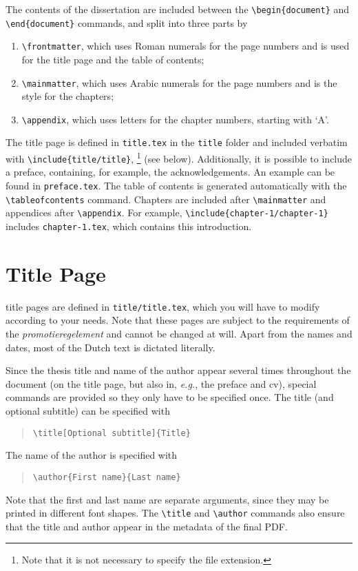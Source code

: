 The contents of the dissertation are included between the \texttt{\textbackslash begin\{document\}} and \texttt{\textbackslash end\{document\}} commands, and split into three parts by
\begin{enumerate}
\item\texttt{\textbackslash frontmatter}, which uses Roman numerals for the page numbers and is used for the title page and the table of contents;
\item\texttt{\textbackslash mainmatter}, which uses Arabic numerals for the page numbers and is the style for the chapters;
\item\texttt{\textbackslash appendix}, which uses letters for the chapter numbers, starting with `A'.
\end{enumerate}
The title page is defined in \texttt{title.tex} in the \texttt{title} folder and included verbatim with \texttt{\textbackslash include\{title/title\}},
\footnote{Note that it is not necessary to specify the file extension.} (see below).
Additionally, it is possible to include a preface, containing, for example, the acknowledgements.
An example can be found in \texttt{preface.tex}.
The table of contents is generated automatically with the \texttt{\textbackslash tableofcontents} command.
Chapters are included after \texttt{\textbackslash mainmatter} and appendices after \texttt{\textbackslash appendix}.
For example, \texttt{\textbackslash include\{chapter-1/chapter-1\}} includes \texttt{chapter-1.tex}, which contains this introduction.

\section{Title Page}

 title pages are defined in \texttt{title/title.tex}, which you will have to modify according to your needs.
Note that these pages are subject to the requirements of the \emph{promotieregelement} and cannot be changed at will.
Apart from the names and dates, most of the Dutch text is dictated literally.

Since the thesis title and name of the author appear several times throughout the document
(on the title page, but also in, \emph{e.g.}, the preface and cv),
special commands are provided so they only have to be specified once.
The title (and optional subtitle) can be specified with

\begin{quote}
\texttt{\textbackslash title[Optional subtitle]\{Title\}}
\end{quote}
The name of the author is specified with
\begin{quote}
\texttt{\textbackslash author\{First name\}\{Last name\}}
\end{quote}
Note that the first and last name are separate arguments, since they may be printed in different font shapes.
The \texttt{\textbackslash title} and \texttt{\textbackslash author} commands also ensure that the title and author appear in the metadata of the final PDF.

